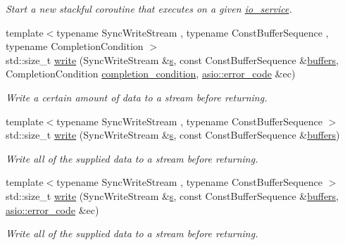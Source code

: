 \begin{DoxyCompactItemize}
\begin{DoxyCompactList}\small\item\em Start a new stackful coroutine that executes on a given \hyperlink{classasio_1_1io__service}{io\+\_\+service}. \end{DoxyCompactList}\item 
{\footnotesize template$<$typename Sync\+Write\+Stream , typename Const\+Buffer\+Sequence , typename Completion\+Condition $>$ }\\std\+::size\+\_\+t \hyperlink{group__write_gaf53a6638aac728c8bf61621b12fa8fce}{write} (Sync\+Write\+Stream \&\hyperlink{group__async__connect_ga31ab74b9ea6c77932dddd016cfc7920a}{s}, const Const\+Buffer\+Sequence \&\hyperlink{group__async__read_ga54dede45c3175148a77fe6635222c47d}{buffers}, Completion\+Condition \hyperlink{group__async__read_gae2e215d5013596cc2b385bb6c13fa518}{completion\+\_\+condition}, \hyperlink{classasio_1_1error__code}{asio\+::error\+\_\+code} \&ec)
\begin{DoxyCompactList}\small\item\em Write a certain amount of data to a stream before returning. \end{DoxyCompactList}\item 
{\footnotesize template$<$typename Sync\+Write\+Stream , typename Const\+Buffer\+Sequence $>$ }\\std\+::size\+\_\+t \hyperlink{group__write_gab293266ad69e271fdda0ff6f8086fb5c}{write} (Sync\+Write\+Stream \&\hyperlink{group__async__connect_ga31ab74b9ea6c77932dddd016cfc7920a}{s}, const Const\+Buffer\+Sequence \&\hyperlink{group__async__read_ga54dede45c3175148a77fe6635222c47d}{buffers})
\begin{DoxyCompactList}\small\item\em Write all of the supplied data to a stream before returning. \end{DoxyCompactList}\item 
{\footnotesize template$<$typename Sync\+Write\+Stream , typename Const\+Buffer\+Sequence $>$ }\\std\+::size\+\_\+t \hyperlink{group__write_gacfe88679a7a77cbb22870cafa20414cb}{write} (Sync\+Write\+Stream \&\hyperlink{group__async__connect_ga31ab74b9ea6c77932dddd016cfc7920a}{s}, const Const\+Buffer\+Sequence \&\hyperlink{group__async__read_ga54dede45c3175148a77fe6635222c47d}{buffers}, \hyperlink{classasio_1_1error__code}{asio\+::error\+\_\+code} \&ec)
\begin{DoxyCompactList}\small\item\em Write all of the supplied data to a stream before returning. \end{DoxyCompactList}\item 

\end{DoxyCompactItemize}

